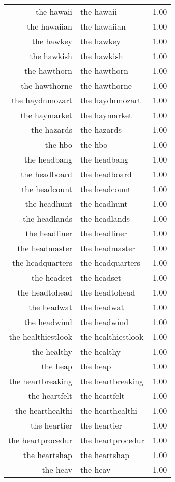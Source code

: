 \begin{table}[ht]
\begin{tabular}{rlr}
  the hawaii & the hawaii & 1.00 \\ 
  the hawaiian & the hawaiian & 1.00 \\ 
  the hawkey & the hawkey & 1.00 \\ 
  the hawkish & the hawkish & 1.00 \\ 
  the hawthorn & the hawthorn & 1.00 \\ 
  the hawthorne & the hawthorne & 1.00 \\ 
  the haydnmozart & the haydnmozart & 1.00 \\ 
  the haymarket & the haymarket & 1.00 \\ 
  the hazards & the hazards & 1.00 \\ 
  the hbo & the hbo & 1.00 \\ 
  the headbang & the headbang & 1.00 \\ 
  the headboard & the headboard & 1.00 \\ 
  the headcount & the headcount & 1.00 \\ 
  the headhunt & the headhunt & 1.00 \\ 
  the headlands & the headlands & 1.00 \\ 
  the headliner & the headliner & 1.00 \\ 
  the headmaster & the headmaster & 1.00 \\ 
  the headquarters & the headquarters & 1.00 \\ 
  the headset & the headset & 1.00 \\ 
  the headtohead & the headtohead & 1.00 \\ 
  the headwat & the headwat & 1.00 \\ 
  the headwind & the headwind & 1.00 \\ 
  the healthiestlook & the healthiestlook & 1.00 \\ 
  the healthy & the healthy & 1.00 \\ 
  the heap & the heap & 1.00 \\ 
  the heartbreaking & the heartbreaking & 1.00 \\ 
  the heartfelt & the heartfelt & 1.00 \\ 
  the hearthealthi & the hearthealthi & 1.00 \\ 
  the heartier & the heartier & 1.00 \\ 
  the heartprocedur & the heartprocedur & 1.00 \\ 
  the heartshap & the heartshap & 1.00 \\ 
  the heav & the heav & 1.00 \\ 

\end{tabular}
\end{table}
